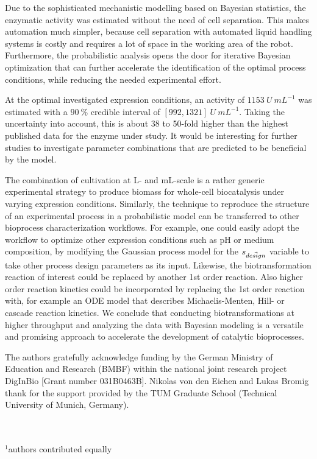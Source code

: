 \documentclass[sn-standardnature]{sn-jnl}%
\def\vec{\mathaccent "017E\relax }
\theoremstyle{thmstyleone}%
\theoremstyle{thmstyletwo}%
\theoremstyle{thmstylethree}%
\begin{document}
Due to the sophisticated mechanistic modelling based on Bayesian statistics, the enzymatic activity was estimated without the need of cell separation.
This makes automation much simpler, because cell separation with automated liquid handling systems is costly and requires a lot of space in the working area of the robot.
Furthermore, the probabilistic analysis opens the door for iterative Bayesian optimization that can further accelerate the identification of the optimal process conditions, while reducing the needed experimental effort.

At the optimal investigated expression conditions, an activity of $1153\ U\ mL^{-1}$ was estimated with a $90\ \%$ credible interval of $[992, 1321]\ U\ mL^{-1}$.
Taking the uncertainty into account, this is about 38 to 50-fold higher than the highest published data for the enzyme under study.
It would be interesting for further studies to investigate parameter combinations that are predicted to be beneficial by the model.

The combination of cultivation at L- and mL-scale is a rather generic experimental strategy to produce biomass for whole-cell biocatalysis under varying expression conditions.
Similarly, the technique to reproduce the structure of an experimental process in a probabilistic model can be transferred to other bioprocess characterization workflows.
For example, one could easily adopt the workflow to optimize other expression conditions such as pH or medium composition, by modifying the Gaussian process model for the $s_{\vec{design}}$ variable to take other process design parameters as its input.
Likewise, the biotransformation reaction of interest could be replaced by another 1st order reaction.
Also higher order reaction kinetics could be incorporated by replacing the 1st order reaction with, for example an ODE model that describes Michaelis-Menten, Hill- or cascade reaction kinetics.
We conclude that conducting biotransformations at higher throughput and analyzing the data with Bayesian modeling is a versatile and promising approach to accelerate the development of catalytic bioprocesses.


\backmatter
{}
The authors gratefully acknowledge funding by the German Ministry of Education and Research (BMBF) within the national joint research project DigInBio [Grant number 031B0463B].
Nikolas von den Eichen and Lukas Bromig thank for the support provided by the TUM Graduate School (Technical University of Munich, Germany).





\mbox{}\\
\mbox{}\\
$^1$authors contributed equally
\end{document}
